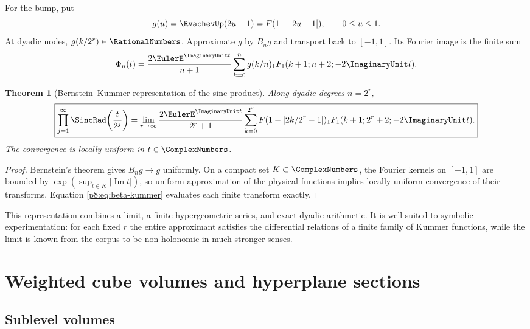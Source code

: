 \documentclass[11pt]{article}
\newtheorem{theorem}{Theorem}[section]
\theoremstyle{definition}
\theoremstyle{remark}
\begin{document}
For the bump, put
\begin{equation}
 g(u)=\RvachevUp(2u-1)=F(1-|2u-1|),\qquad 0\le u\le1.           \label{p8:eq:g-up}
\end{equation}
At dyadic nodes, $g(k/2^r)\in\RationalNumbers$.  Approximate $g$ by $B_ng$ and transport
back to $[-1,1]$.  Its Fourier image is the finite sum
\begin{equation}
 \Phi_n(t)=\frac{2\EulerE^{\ImaginaryUnit t}}{n+1}
 \sum_{k=0}^{n}g(k/n)
 {}_1F_1(k+1;n+2;-2\ImaginaryUnit t).                              \label{p8:eq:up-bernstein-kummer-finite}
\end{equation}

\begin{theorem}[Bernstein--Kummer representation of the sinc product]
\label{p8:thm:bernstein-kummer}
Along dyadic degrees $n=2^r$,
\begin{equation}
 \boxed{\displaystyle
 \prod_{j=1}^\infty\SincRad\!\left(\frac{t}{2^j}\right)
 =\lim_{r\to\infty}
 \frac{2\EulerE^{\ImaginaryUnit t}}{2^r+1}
 \sum_{k=0}^{2^r}F(1-|2k/2^r-1|)
 {}_1F_1(k+1;2^r+2;-2\ImaginaryUnit t).}                           \label{p8:eq:bernstein-kummer-limit}
\end{equation}
The convergence is locally uniform in $t\in\ComplexNumbers$.
\end{theorem}

\begin{proof}
Bernstein's theorem gives $B_ng\to g$ uniformly.  On a compact set
$K\subset\ComplexNumbers$, the Fourier kernels on $[-1,1]$ are bounded by
$\exp(\sup_{t\in K}|\operatorname{Im}t|)$, so uniform approximation of the
physical functions implies locally uniform convergence of their transforms.
Equation \eqref{p8:eq:beta-kummer} evaluates each finite transform exactly.
\end{proof}

This representation combines a limit, a finite hypergeometric series, and
exact dyadic arithmetic.  It is well suited to symbolic experimentation:
for each fixed $r$ the entire approximant satisfies the differential
relations of a finite family of Kummer functions, while the limit is known
from the corpus to be non-holonomic in much stronger senses.

\section{Weighted cube volumes and hyperplane sections}
\label{p8:sec:cube}

\subsection{Sublevel volumes}
\end{document}
